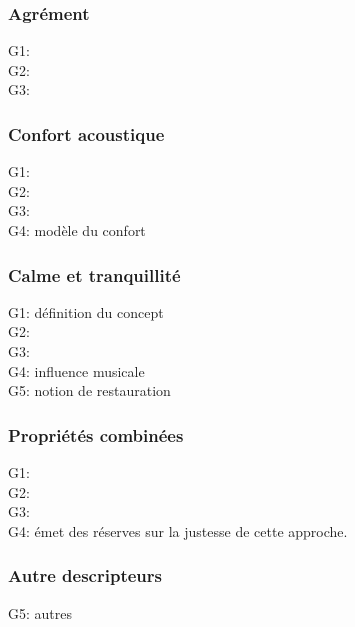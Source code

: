 \subsubsection{Agrément}

G1: \citep{garcia2012validation} \\
G2: \citep{lavandier2006contribution}\\
G3: \citep{guillen2007importance}

\subsubsection{Confort acoustique}

G1: \citep{yang2005acoustic,meng2013field}\\
G2: \citep{jeon2011non,jeon2013soundwalk}\\
G3: \citep{tse2012perception}\\
G4: \citep{yu2009modeling} modèle du confort

\subsubsection{Calme et tranquillité}

G1: \citep{delaitre2012definition} définition du concept\\
G2: \citep{pheasant2008acoustic,pheasant2009validation}\\
G3: \citep{memoli2008soundscape}\\
G4: \citep{de2006quiet,de2013characterizing} influence musicale\\
G5: \citep{payne2013production} notion de restauration

\subsubsection{Propriétés combinées}

G1: \citep{davies2013perception}\\
G2: \citep{cain2013development}\\
G3: \citep{axelsson2010principal}\\
G4: \citep{hall2013exploratory} émet des réserves sur la justesse de cette approche.

\subsubsection{Autre descripteurs}

G5: \citep{kang2010semantic} autres


